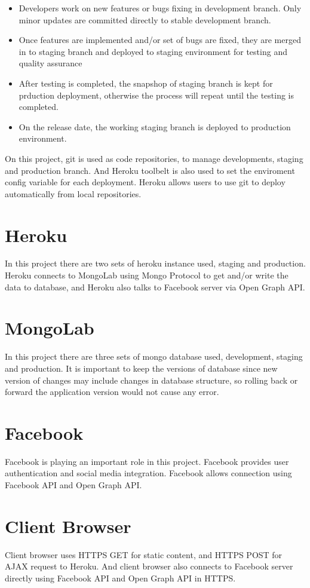 \begin{itemize}
\item Developers work on new features or bugs fixing in development branch. Only minor updates are committed directly to stable development branch.
\item Once features are implemented and/or set of bugs are fixed, they are merged in to staging branch and deployed to staging environment for testing and quality assurance
\item After testing is completed, the snapshop of staging branch is kept for prduction deployment, otherwise the process will repeat until the testing is completed.
\item On the release date, the working staging branch is deployed to production environment.
\end{itemize}

On this project, git is used as code repositories, to manage developments, staging and production branch. And Heroku toolbelt is also used to set the enviroment config variable for each deployment. Heroku allows users to use git to deploy automatically from local repositories. 
 
\section{Heroku}
In this project there are two sets of heroku instance used, staging and production. 
Heroku connects to MongoLab using Mongo Protocol to get and/or write the data to database, and Heroku also talks to Facebook server via Open Graph API.

\section{MongoLab}
In this project there are three sets of mongo database used, development, staging and production. It is important to keep the versions of database since new version of changes may include changes in database structure, so rolling back or forward the application version would not cause any error. 

\section{Facebook}
Facebook is playing an important role in this project. Facebook provides user authentication and social media integration. Facebook allows connection using Facebook API and Open Graph API.

\section{Client Browser}
Client browser uses HTTPS GET for static content, and HTTPS POST for AJAX request to Heroku. And client browser also connects to Facebook server directly using Facebook API and Open Graph API in HTTPS.
 
